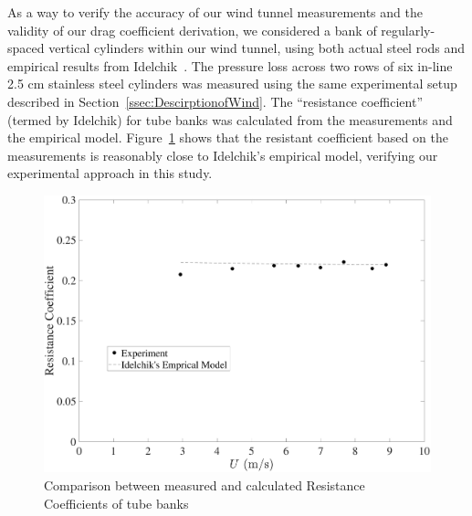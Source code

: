 \documentclass[12pt]{article}
\begin{document}
As a way to verify the accuracy of our wind tunnel measurements and the validity of our drag coefficient derivation, we considered a bank of regularly-spaced vertical cylinders within our wind tunnel, using both actual steel rods and empirical results from Idelchik~\cite{Idelchik1994}. The pressure loss across two rows of six in-line 2.5 cm stainless steel cylinders was measured using the same experimental setup described in Section~\ref{ssec:DescirptionofWind}. The ``resistance coefficient'' (termed by Idelchik) for tube banks was calculated from the measurements and the empirical model. Figure~\ref{fig:RESCOEF} shows that the resistant coefficient based on the measurements is reasonably close to Idelchik's empirical model, verifying our experimental approach in this study.

\begin{figure}[!h]
	\centering
    \includegraphics[width=.8\textwidth,keepaspectratio]{Picture14.pdf}
	\caption[Comparison between Resistance Coefficients of tube banks ]{Comparison between measured and calculated Resistance Coefficients of tube banks}
	\label{fig:RESCOEF}
\end{figure}
\end{document}
